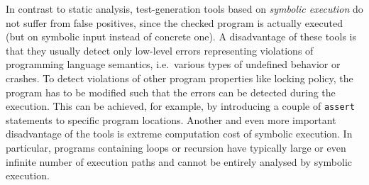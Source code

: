 \documentclass[10pt]{llncs}
\begin{document}
In contrast to static analysis, test-generation tools based on
\emph{symbolic execution} do not suffer from false positives, since the
checked program is actually executed (but on symbolic input instead of
concrete one). A disadvantage of these tools is that they usually detect
only low-level errors representing violations of programming language
semantics, i.e.~various types of undefined behavior or crashes. To detect
violations of other program properties like locking policy, the program has
to be modified such that the errors can be detected during the
execution. This can be achieved, for example, by introducing a couple of
\texttt{assert} statements to specific program locations.
Another and even more important disadvantage of the tools
is extreme computation cost of symbolic execution. In particular, programs
containing loops or recursion have typically large or even infinite number
of execution paths and cannot be entirely analysed by symbolic execution.
\end{document}
